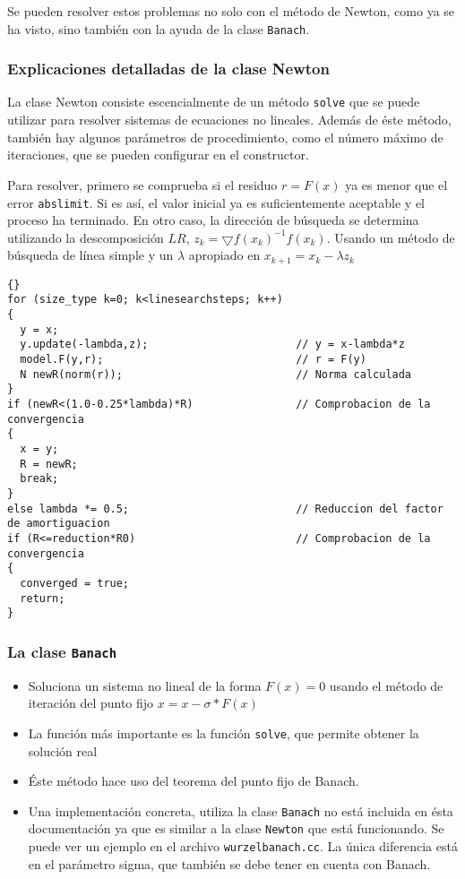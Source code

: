 Se pueden resolver estos problemas no solo con el método de Newton, como ya se ha visto, sino también con la ayuda de la clase \lstinline{Banach}.

\subsubsection{Explicaciones detalladas de la clase Newton}
La clase Newton consiste escencialmente de un método \lstinline{solve} que se puede
utilizar para resolver sistemas de ecuaciones no lineales. Además de éste método,
también hay algunos parámetros de procedimiento, como el número máximo de iteraciones,
que se pueden configurar en el constructor.

Para resolver, primero se comprueba si el residuo $r=F(x)$ ya es menor que el error \lstinline{abslimit}. Si es así, el valor inicial ya es suficientemente aceptable y el proceso ha terminado. En otro caso, la dirección de búsqueda se determina utilizando la descomposición $LR$, $z_k = \bigtriangledown f(x_k)^{-1}f(x_k)$.  Usando un método de búsqueda de línea
simple y un $\lambda$ apropiado en $x_{k+1}=x_k-\lambda z_k$

{\footnotesize{\begin{lstlisting}{}
for (size_type k=0; k<linesearchsteps; k++)
{
  y = x;
  y.update(-lambda,z);                       // y = x-lambda*z
  model.F(y,r);                              // r = F(y)
  N newR(norm(r));                           // Norma calculada
}
if (newR<(1.0-0.25*lambda)*R)                // Comprobacion de la convergencia
{
  x = y;
  R = newR;
  break;
}
else lambda *= 0.5;                          // Reduccion del factor de amortiguacion
if (R<=reduction*R0)                         // Comprobacion de la convergencia
{
  converged = true;
  return;
}
\end{lstlisting}}}


\subsubsection{La clase \lstinline{Banach}}
\begin{itemize}
\item Soluciona un sistema no lineal de la forma $F(x)=0$ usando el método de iteración del punto fijo $x = x - \sigma*F(x)$
\item La función más importante es la función \lstinline{solve}, que permite obtener la solución real
\item Éste método hace uso del teorema del punto fijo de Banach.
\item Una implementación concreta, utiliza la clase \lstinline{Banach} 
no está incluida en ésta documentación ya que es similar a la clase
  \lstinline{Newton} que está funcionando. Se puede ver un ejemplo en el archivo
  \lstinline{wurzelbanach.cc}. La única diferencia está en el parámetro sigma, que también se debe tener en cuenta con Banach.
\end{itemize}





